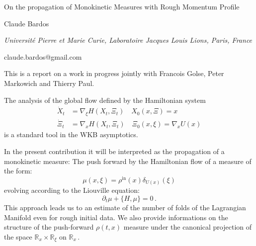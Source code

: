 \documentclass[10pt,a4paper]{article}
\def\R{\mathbb{R}}
\begin{document}
\begin{center}

{\Large On the propagation of Monokinetic Measures with Rough Momentum Profile}

\bigskip

{\sc Claude Bardos}

{\small\it Universit{\'e} Pierre et Marie Curie, Laboratoire Jacques Louis Lions, Paris, France}

{\small\rm claude.bardos@gmail.com}

\end{center}

\bigskip

This is a report on a work in progress jointly with Francois Golse, Peter Markowich and Thierry Paul.

The analysis of the global flow defined by the Hamiltonian system
$$
\begin{aligned}
\dot X_t&=\nabla_\xi H(X_t,\Xi_t)\quad X_0(x,\Xi)= x\\
\dot \Xi_t&= \nabla_x H(X_t,\Xi_t) \quad \Xi_0(x,\xi)=\nabla_x U(x) \end{aligned}
$$
is a standard tool in the WKB asymptotics.

In the present contribution  it will be interpreted as the propagation of a monokinetic measure:
The push forward by the Hamiltonian flow of a measure of the form:
$$\mu(x,\xi)=\rho^{\mathrm{in}}(x)\delta_{U(x)}(\xi)$$
evolving according to the Liouville equation:
$$ \partial_t\mu +\{H,\mu\}=0\,.$$
This approach leads us to an estimate of the number of folds of the Lagrangian Manifold even for rough initial data.
We also provide informations on the structure of the push-forward $\rho(t,x)$
measure under the canonical projection of the space $\R_x\times\R_\xi$ on $\R_x\,.$
\bigskip
\end{document}
